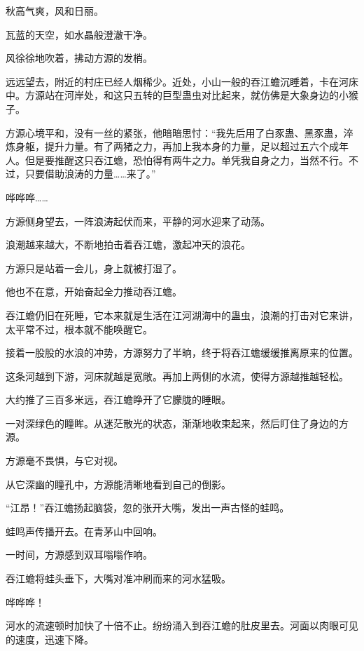 
\begin{this_body}

秋高气爽，风和日丽。

瓦蓝的天空，如水晶般澄澈干净。

风徐徐地吹着，拂动方源的发梢。

远远望去，附近的村庄已经人烟稀少。近处，小山一般的吞江蟾沉睡着，卡在河床中。方源站在河岸处，和这只五转的巨型蛊虫对比起来，就仿佛是大象身边的小猴子。

方源心境平和，没有一丝的紧张，他暗暗思忖：“我先后用了白豕蛊、黑豕蛊，淬炼身躯，提升力量。有了两猪之力，再加上我本身的力量，足以超过五六个成年人。但是要推醒这只吞江蟾，恐怕得有两牛之力。单凭我自身之力，当然不行。不过，只要借助浪涛的力量……来了。”

哗哗哗……

方源侧身望去，一阵浪涛起伏而来，平静的河水迎来了动荡。

浪潮越来越大，不断地拍击着吞江蟾，激起冲天的浪花。

方源只是站着一会儿，身上就被打湿了。

他也不在意，开始奋起全力推动吞江蟾。

吞江蟾仍旧在死睡，它本来就是生活在江河湖海中的蛊虫，浪潮的打击对它来讲，太平常不过，根本就不能唤醒它。

接着一股股的水浪的冲势，方源努力了半晌，终于将吞江蟾缓缓推离原来的位置。

这条河越到下游，河床就越是宽敞。再加上两侧的水流，使得方源越推越轻松。

大约推了三百多米远，吞江蟾睁开了它朦胧的睡眼。

一对深绿色的瞳眸。从迷茫散光的状态，渐渐地收束起来，然后盯住了身边的方源。

方源毫不畏惧，与它对视。

从它深幽的瞳孔中，方源能清晰地看到自己的倒影。

“江昂！”吞江蟾扬起脑袋，忽的张开大嘴，发出一声古怪的蛙鸣。

蛙鸣声传播开去。在青茅山中回响。

一时间，方源感到双耳嗡嗡作响。

吞江蟾将蛙头垂下，大嘴对准冲刷而来的河水猛吸。

哗哗哗！

河水的流速顿时加快了十倍不止。纷纷涌入到吞江蟾的肚皮里去。河面以肉眼可见的速度，迅速下降。


\end{this_body}

